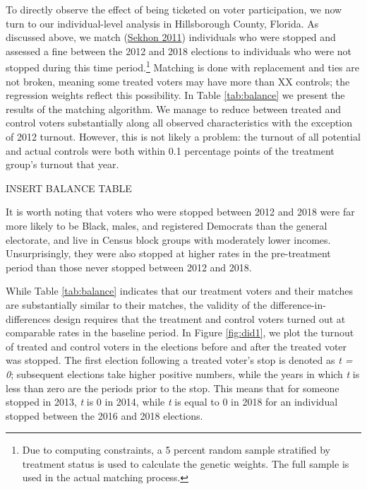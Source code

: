 \documentclass[
  12pt,
]{article}
\begin{document}
To directly observe the effect of being ticketed on voter participation, we now turn to our individual-level analysis in Hillsborough County, Florida. As discussed above, we match (\protect\hyperlink{ref-Sekhon2011}{Sekhon 2011}) individuals who were stopped and assessed a fine between the 2012 and 2018 elections to individuals who were not stopped during this time period.\footnote{Due to computing constraints, a 5 percent random sample stratified by treatment status is used to calculate the genetic weights. The full sample is used in the actual matching process.} Matching is done with replacement and ties are not broken, meaning some treated voters may have more than XX controls; the regression weights reflect this possibility. In Table \ref{tab:balance} we present the results of the matching algorithm. We manage to reduce between treated and control voters substantially along all observed characteristics with the exception of 2012 turnout. However, this is not likely a problem: the turnout of all potential and actual controls were both within 0.1 percentage points of the treatment group's turnout that year.

INSERT BALANCE TABLE

It is worth noting that voters who were stopped between 2012 and 2018 were far more likely to be Black, males, and registered Democrats than the general electorate, and live in Census block groups with moderately lower incomes. Unsurprisingly, they were also stopped at higher rates in the pre-treatment period than those never stopped between 2012 and 2018.

While Table \ref{tab:balance} indicates that our treatment voters and their matches are substantially similar to their matches, the validity of the difference-in-differences design requires that the treatment and control voters turned out at comparable rates in the baseline period. In Figure \ref{fig:did1}, we plot the turnout of treated and control voters in the elections before and after the treated voter was stopped. The first election following a treated voter's stop is denoted as \emph{t = 0}; subsequent elections take higher positive numbers, while the years in which \emph{t} is less than zero are the periods prior to the stop. This means that for someone stopped in 2013, \emph{t} is 0 in 2014, while \emph{t} is equal to 0 in 2018 for an individual stopped between the 2016 and 2018 elections.
\end{document}
